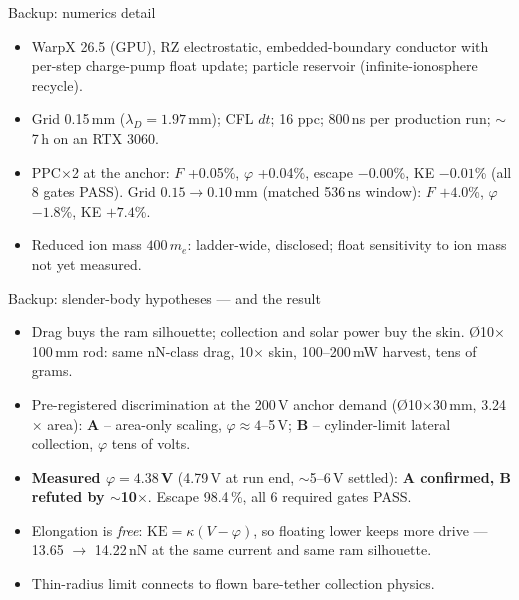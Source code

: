 \documentclass[10pt,aspectratio=169]{beamer}
\begin{document}
\begin{frame}{Backup: numerics detail}
  \begin{itemize}\small
    \item WarpX 26.5 (GPU), RZ electrostatic, embedded-boundary conductor
          with per-step charge-pump float update; particle reservoir
          (infinite-ionosphere recycle).
    \item Grid 0.15\,mm ($\lambda_D = 1.97$\,mm); CFL $dt$; 16 ppc;
          800\,ns per production run; $\sim$7\,h on an RTX 3060.
    \item PPC$\times$2 at the anchor: $F$ +0.05\%, $\varphi$ +0.04\%,
          escape $-0.00$\%, KE $-0.01$\% (all 8 gates PASS). Grid
          $0.15\to0.10$\,mm (matched 536\,ns window): $F$ $+4.0$\%,
          $\varphi$ $-1.8$\%, KE $+7.4$\%.
    \item Reduced ion mass $400\,m_e$: ladder-wide, disclosed; float
          sensitivity to ion mass not yet measured.
  \end{itemize}
\end{frame}

\begin{frame}{Backup: slender-body hypotheses --- and the result}
  \begin{itemize}\small
    \item Drag buys the ram silhouette; collection and solar power buy the
          skin. \O10$\times$100\,mm rod: same nN-class drag, 10$\times$ skin,
          100--200\,mW harvest, tens of grams.
    \item Pre-registered discrimination at the 200\,V anchor demand
          (\O10$\times$30\,mm, 3.24$\times$ area):
          \textbf{A} -- area-only scaling, $\varphi \approx 4$--5\,V;
          \textbf{B} -- cylinder-limit lateral collection, $\varphi$ tens of
          volts.
    \item \textbf{Measured $\varphi = 4.38$\,V} (4.79\,V at run end,
          $\sim$5--6\,V settled): \textbf{A confirmed, B refuted by
          $\sim$10$\times$}. Escape 98.4\,\%, all 6 required gates PASS.
    \item Elongation is \emph{free}: $\mathrm{KE} = \kappa(V-\varphi)$, so
          floating lower keeps more drive --- 13.65 $\to$ 14.22\,nN at the
          same current and same ram silhouette.
    \item Thin-radius limit connects to flown bare-tether collection
          physics.
  \end{itemize}
\end{frame}
\end{document}
